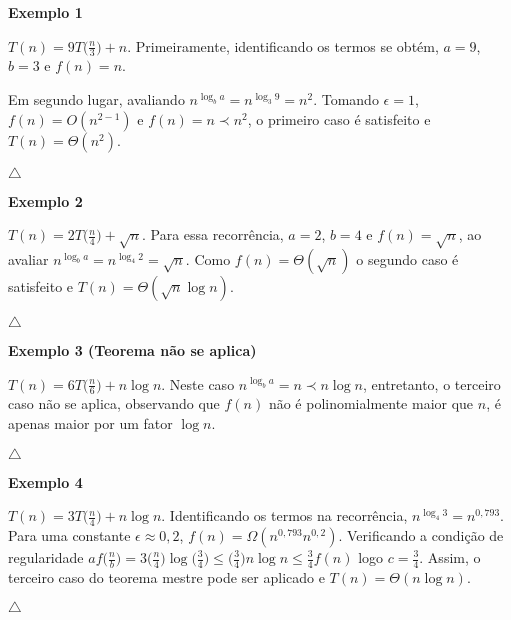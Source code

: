 \textbf{Exemplo 1}

$T(n)=9T\Bigr(\frac{n}{3}\Bigr) + n$. Primeiramente, identificando os termos se obtém, $a=9$, $b=3$ e $f(n)=n$.

Em segundo lugar, avaliando $n^{\log_ba}=n^{\log_3 9} = n^2$. Tomando $\epsilon = 1$, $f(n) = O(n^{2-1})$ e $f(n) = n \prec n^2$, o primeiro caso é satisfeito e $T(n) = \Theta(n^2).$

{\raggedleft $\bigtriangleup$ \par}

\textbf{Exemplo 2}

$T(n) = 2T\Bigr(\frac{n}{4}\Bigr) + \sqrt{n}$. Para essa recorrência, $a = 2$, $b = 4$ e $f(n) = \sqrt{n}$, ao avaliar $n^{\log_ba}=n^{\log_4 2} = \sqrt{n}$. Como $f(n) = \Theta(\sqrt{n})$ o segundo caso é satisfeito e $T(n) = \Theta(\sqrt{n}\log n)$.

{\raggedleft $\bigtriangleup$ \par}

\textbf{Exemplo 3 (Teorema não se aplica)}

$T(n) = 6T\Bigr(\frac{n}{6}\Bigr) + {n \log n}$. Neste caso $n^{\log_ba} = n \prec n \log n$, entretanto, o terceiro caso não se aplica, observando que $f(n)$ não é polinomialmente maior que $n$, é apenas maior por um fator $\log n$.

{\raggedleft $\bigtriangleup$ \par}

\textbf{Exemplo 4}

$T(n) = 3T\Bigr(\frac{n}{4}\Bigr) + {n \log n}$. Identificando os termos na recorrência, $n^{\log_4 3} = n^{0,793}$. Para uma constante $\epsilon \approx 0,2$, $f(n) = \Omega(n^{0,793}n^{0,2})$. Verificando a condição de regularidade $af\Bigr(\frac{n}{b}\Bigr) = 3\Bigr(\frac{n}{4}\Bigr)\log\Bigr(\frac{3}{4}\Bigr) \leq \Bigr(\frac{3}{4}\Bigr) n \log n \leq \frac{3}{4}f(n)$ logo $c=\frac{3}{4}$. Assim, o terceiro caso do teorema mestre pode ser aplicado e $T(n) = \Theta (n \log n)$.

{\raggedleft $\bigtriangleup$ \par}